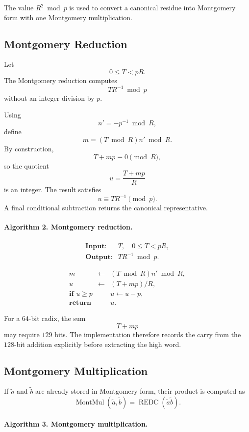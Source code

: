 The value \(R^2\bmod p\) is used to convert a canonical residue into
Montgomery form with one Montgomery multiplication.

\subsection{Montgomery Reduction}
\label{sec:montgomery-redc}

Let
\[
0\le T<pR.
\]
The Montgomery reduction computes
\[
TR^{-1}\bmod p
\]
without an integer division by \(p\).

Using
\[
n'=-p^{-1}\bmod R,
\]
define
\[
m=(T\bmod R)n'\bmod R.
\]
By construction,
\[
T+mp
\equiv 0\pmod R,
\]
so the quotient
\[
u=\frac{T+mp}{R}
\]
is an integer.  The result satisfies
\[
u\equiv TR^{-1}\pmod p.
\]
A final conditional subtraction returns the canonical representative.

\paragraph{Algorithm 2. Montgomery reduction.}

\[
\begin{array}{ll}
\textbf{Input:} & T,\quad 0\le T<pR,\\
\textbf{Output:} & TR^{-1}\bmod p.
\end{array}
\]

\[
\begin{array}{rcl}
m &\leftarrow& (T\bmod R)n'\bmod R,\\
u &\leftarrow& (T+mp)/R,\\
\textbf{if }u\ge p && u\leftarrow u-p,\\
\textbf{return}&&u.
\end{array}
\]

For a \(64\)-bit radix, the sum
\[
T+mp
\]
may require \(129\) bits.  The implementation therefore records the carry
from the \(128\)-bit addition explicitly before extracting the high word.

\subsection{Montgomery Multiplication}
\label{sec:montgomery-mul}

If \(\widetilde{a}\) and \(\widetilde{b}\) are already stored in Montgomery
form, their product is computed as
\[
\operatorname{MontMul}
(\widetilde{a},\widetilde{b})
=
\operatorname{REDC}
(\widetilde{a}\widetilde{b}).
\]

\paragraph{Algorithm 3. Montgomery multiplication.}

